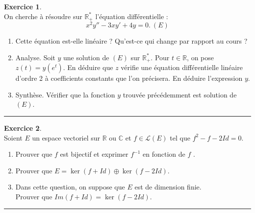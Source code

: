 \documentclass[a4paper,10pt]{article}
\theoremstyle{definition}
\theoremstyle{definition}
\newtheorem{exo}{Exercice}
\newcommand{\C}{\mathbb{C}}
\newcommand{\R}{\mathbb{R}}
\begin{document}
\newpage
\begin{exo}\quad\\[0.25cm]%
On cherche à résoudre sur $\mathbb R_+^*$ l’équation différentielle :
$$x^2y''-3xy'+4y = 0 .\ (E)$$
\begin{enumerate}
	\item Cette équation est-elle linéaire ? Qu’est-ce qui change par rapport au cours ?
	\item  Analyse. Soit $y$ une solution de $(E)$ sur $\mathbb R_+^*$. Pour $t\in\mathbb R$, on pose $z(t)=y(e^t)$. En déduire que $z$ vériﬁe une équation différentielle linéaire d’ordre 2 à coefficients  constants que l’on précisera. En déduire l'expression $y$.
	\item Synthèse. Vérifier que la fonction $y$ trouvée précédemment est solution de $(E)$.
\end{enumerate}

\centering
\rule{1\linewidth}{0.6pt}
\end{exo}			


\begin{exo}\quad\\[0.25cm]
	Soient $E$ un espace vectoriel sur $\R$ ou $\C$ et $f \in \mathcal{L}(E)$ tel que $f^2 - f - 2Id = 0$.
	
	\begin{enumerate}
		\item Prouver que $f$ est bijectif et exprimer $f^{-1}$ en fonction de $f$ .
		\item Prouver que $E = \ker(f + Id) \oplus \ker(f - 2Id)$.
		\item Dans cette question, on suppose que $E$ est de dimension finie.\\
		Prouver que $Im(f + Id) = \ker(f - 2Id)$.
		
	\end{enumerate}
	\centering
	\rule{1\linewidth}{0.6pt}
\end{exo}
\end{document}
